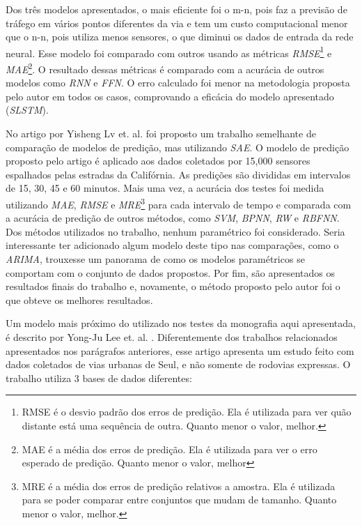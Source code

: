 Dos três modelos apresentados, o mais eficiente foi o m-n, pois faz a previsão de tráfego em vários pontos diferentes da via e tem um custo computacional menor que o n-n, pois utiliza menos sensores, o que diminui os dados de entrada da rede neural. Esse modelo foi comparado com outros usando as métricas \textit{\acrfull{RMSE}}\footnote{RMSE é o desvio padrão dos erros de predição. Ela é utilizada para ver quão distante está uma sequência de outra. Quanto menor o valor, melhor.} e \textit{\acrfull{MAE}}\footnote{MAE é a média dos erros de predição. Ela é utilizada para ver o erro esperado de predição. Quanto menor o valor, melhor}. O resultado dessas métricas é comparado com a acurácia de outros modelos como \textit{\acrshort{RNN}} e \textit{\acrfull{FFN}}. O erro calculado foi menor na metodologia proposta pelo autor em todos os casos, comprovando a eficácia do modelo apresentado (\textit{\acrshort{SLSTM}}).

No artigo \cite{lv_6894591} por Yisheng Lv et. al. foi proposto um trabalho semelhante de comparação de modelos de predição, mas utilizando \textit{\acrfull{SAE}}. O modelo de predição proposto pelo artigo é aplicado aos dados coletados por 15,000 sensores espalhados pelas estradas da Califórnia. As predições são divididas em intervalos de 15, 30, 45 e 60 minutos. Mais uma vez, a acurácia dos testes foi medida utilizando  \textit{\acrshort{MAE}}, \textit{\acrshort{RMSE}} e \textit{\acrfull{MRE}}\footnote{MRE é a média dos erros de predição relativos a amostra. Ela é utilizada para se poder comparar entre conjuntos que mudam de tamanho. Quanto menor o valor, melhor.} para cada intervalo de tempo e comparada com a acurácia de predição de outros métodos, como
\textit{\acrshort{SVM}}, \textit{\acrfull{BPNN}}, \textit{\acrfull{RW}} e \textit{\acrfull{RBFNN}}. Dos métodos utilizados no trabalho, nenhum paramétrico foi considerado. Seria interessante ter adicionado algum modelo deste tipo nas comparações, como o \textit{\acrfull{ARIMA}}, trouxesse um panorama de como os modelos paramétricos se comportam com o conjunto de dados propostos. Por fim, são apresentados os resultados finais do trabalho e, novamente, o método proposto pelo autor foi o que obteve os melhores resultados. 

Um modelo mais próximo do utilizado nos testes da monografia aqui apresentada, é descrito  por Yong-Ju Lee et. al. \cite{Seoul}. Diferentemente dos trabalhos relacionados apresentados nos parágrafos anteriores, esse artigo apresenta um estudo feito com dados coletados de vias urbanas de Seul, e não somente de rodovias expressas. O trabalho utiliza 3 bases de dados diferentes:

